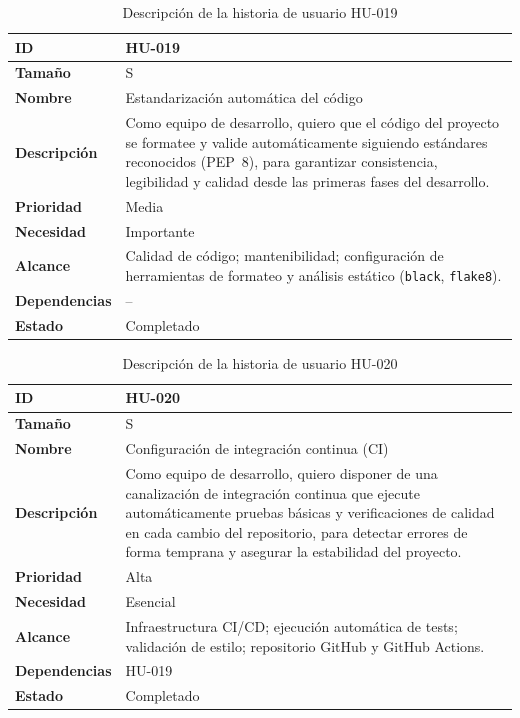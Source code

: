 \documentclass{report}
\begin{document}
\begin{table}[H]
\centering
\caption{Descripción de la historia de usuario HU-019}
\label{tab:hu019}
\begin{tabular}{|l|p{12cm}|}
\hline
\textbf{ID} & HU-019 \\ \hline
\textbf{Tamaño} & S \\ \hline
\textbf{Nombre} & Estandarización automática del código \\ \hline
\textbf{Descripción} &
Como equipo de desarrollo, quiero que el código del proyecto se formatee y valide automáticamente siguiendo estándares reconocidos (PEP~8), para garantizar consistencia, legibilidad y calidad desde las primeras fases del desarrollo. \\ \hline
\textbf{Prioridad} & Media \\ \hline
\textbf{Necesidad} & Importante \\ \hline
\textbf{Alcance} &
Calidad de código; mantenibilidad; configuración de herramientas de formateo y análisis estático (\texttt{black}, \texttt{flake8}). \\ \hline
\textbf{Dependencias} & -- \\ \hline
\textbf{Estado} & Completado \\ \hline
\end{tabular}
\end{table}



\begin{table}[H]
\centering
\caption{Descripción de la historia de usuario HU-020}
\label{tab:hu020}
\begin{tabular}{|l|p{12cm}|}
\hline
\textbf{ID} & HU-020 \\ \hline
\textbf{Tamaño} & S \\ \hline
\textbf{Nombre} & Configuración de integración continua (CI) \\ \hline
\textbf{Descripción} &
Como equipo de desarrollo, quiero disponer de una canalización de integración continua que ejecute automáticamente pruebas básicas y verificaciones de calidad en cada cambio del repositorio, para detectar errores de forma temprana y asegurar la estabilidad del proyecto. \\ \hline
\textbf{Prioridad} & Alta \\ \hline
\textbf{Necesidad} & Esencial \\ \hline
\textbf{Alcance} &
Infraestructura CI/CD; ejecución automática de tests; validación de estilo; repositorio GitHub y GitHub Actions. \\ \hline
\textbf{Dependencias} & HU-019 \\ \hline
\textbf{Estado} & Completado \\ \hline
\end{tabular}
\end{table}
\end{document}
